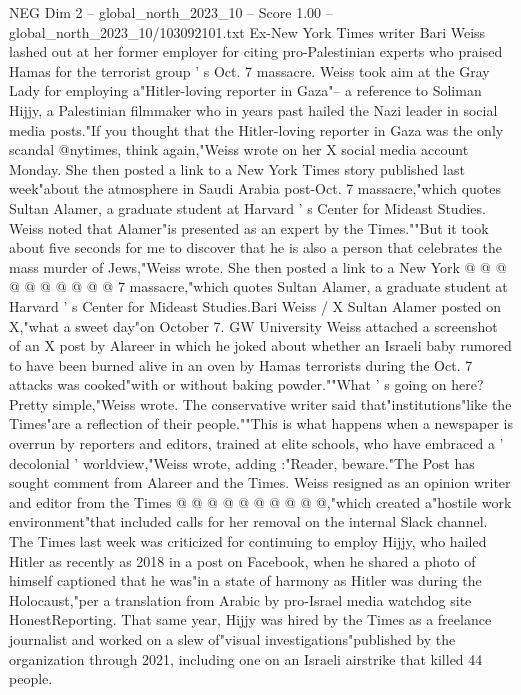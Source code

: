 \begin{textsample}{NEG Dim 2 – global\_north\_2023\_10 – Score 1.00 – global\_north\_2023\_10/103092101.txt}  \label{ex:f2_neg_159}
Ex-New York Times writer Bari Weiss lashed out at her former employer for citing pro-Palestinian experts who praised Hamas for the terrorist group ' s Oct. 7 massacre.
Weiss took aim at the Gray Lady for employing a"Hitler-loving reporter in Gaza"-- a reference to Soliman Hijjy, a Palestinian filmmaker who in years past hailed the Nazi leader in social media posts."If you thought that the Hitler-loving reporter in Gaza was the only scandal @nytimes, think again,"Weiss wrote on her X social media account Monday.
She then posted a link to a New York Times story published last week"about the atmosphere in Saudi Arabia post-Oct. 7 massacre,"which quotes Sultan Alamer, a graduate student at Harvard ' s Center for Mideast Studies.
Weiss noted that Alamer"is presented as an expert by the Times.""But it took about five seconds for me to discover that he is also a person that celebrates the mass murder of Jews,"Weiss wrote.
She then posted a link to a New York @ @ @ @ @ @ @ @ @ @ 7 massacre,"which quotes Sultan Alamer, a graduate student at Harvard ' s Center for Mideast Studies.Bari Weiss / X Sultan Alamer posted on X,"what a sweet day"on October 7.
GW University Weiss attached a screenshot of an X post by Alareer in which he joked about whether an Israeli baby rumored to have been burned alive in an oven by Hamas terrorists during the Oct. 7 attacks was cooked"with or without baking powder.""What ' s going on here?
Pretty simple,"Weiss wrote.
The conservative writer said that"institutions"like the Times"are a reflection of their people.""This is what happens when a newspaper is overrun by reporters and editors, trained at elite schools, who have embraced a ' decolonial ' worldview,"Weiss wrote, adding :"Reader, beware."The Post has sought comment from Alareer and the Times.
Weiss resigned as an opinion writer and editor from the Times @ @ @ @ @ @ @ @ @ @,"which created a"hostile work environment"that included calls for her removal on the internal Slack channel.
The Times last week was criticized for continuing to employ Hijjy, who hailed Hitler as recently as 2018 in a post on Facebook, when he shared a photo of himself captioned that he was"in a state of harmony as Hitler was during the Holocaust,"per a translation from Arabic by pro-Israel media watchdog site HonestReporting.
That same year, Hijjy was hired by the Times as a freelance journalist and worked on a slew of"visual investigations"published by the organization through 2021, including one on an Israeli airstrike that killed 44 people.

\end{textsample}
